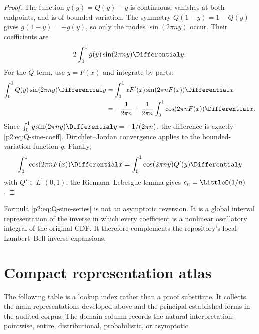 \documentclass[11pt]{article}
\theoremstyle{definition}
\theoremstyle{remark}
\begin{document}
\begin{proof}
The function $g(y)=Q(y)-y$ is continuous, vanishes at both endpoints, and is of bounded
variation.  The symmetry $Q(1-y)=1-Q(y)$ gives $g(1-y)=-g(y)$, so only the modes
$\sin(2\pi ny)$ occur.  Their coefficients are
\[
 2\int_0^1g(y)\sin(2\pi ny)\Differential y.
\]
For the $Q$ term, use $y=F(x)$ and integrate by parts:
\begin{align*}
 \int_0^1Q(y)\sin(2\pi ny)\Differential y
 &=\int_0^1xF'(x)\sin(2\pi nF(x))\Differential x\\
 &=-\frac1{2\pi n}+\frac1{2\pi n}
   \int_0^1\cos(2\pi nF(x))\Differential x.
\end{align*}
Since $\int_0^1y\sin(2\pi ny)\Differential y=-1/(2\pi n)$, the difference is exactly
\eqref{p2:eq:Q-sine-coeff}.  Dirichlet--Jordan convergence applies to the bounded-variation
function $g$.  Finally,
\[
 \int_0^1\cos(2\pi nF(x))\Differential x
 =\int_0^1\cos(2\pi ny)Q'(y)\Differential y
\]
with $Q'\in L^1(0,1)$; the Riemann--Lebesgue lemma gives $c_n=\LittleO(1/n)$.
\end{proof}

\begin{remark}
Formula \eqref{p2:eq:Q-sine-series} is not an asymptotic reversion.  It is a global interval
representation of the inverse in which every coefficient is a nonlinear oscillatory integral
of the original CDF.  It therefore complements the repository's local Lambert--Bell inverse
expansions.
\end{remark}

\section{Compact representation atlas}
\label{p2:sec:atlas}

The following table is a lookup index rather than a proof substitute.  It collects the main
representations developed above and the principal established forms in the audited corpus.
The domain column records the natural interpretation: pointwise, entire, distributional,
probabilistic, or asymptotic.
\end{document}
